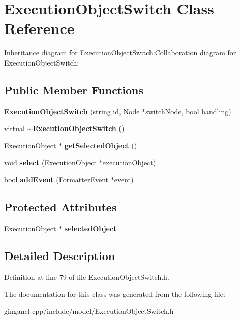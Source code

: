 \section{ExecutionObjectSwitch Class Reference}
\label{classbr_1_1pucrio_1_1telemidia_1_1ginga_1_1ncl_1_1model_1_1switches_1_1ExecutionObjectSwitch}
Inheritance diagram for ExecutionObjectSwitch:Collaboration diagram for ExecutionObjectSwitch:\subsection*{Public Member Functions}
\begin{CompactItemize}
\item 
\textbf{ExecutionObjectSwitch} (string id, Node $\ast$switchNode, bool handling)\label{classbr_1_1pucrio_1_1telemidia_1_1ginga_1_1ncl_1_1model_1_1switches_1_1ExecutionObjectSwitch_b2921cf0a114437720d562ffa4a54dc8}

\item 
virtual {\bf $\sim$ExecutionObjectSwitch} ()\label{classbr_1_1pucrio_1_1telemidia_1_1ginga_1_1ncl_1_1model_1_1switches_1_1ExecutionObjectSwitch_469de2632ae298128da2f5b6f031e8f0}

\item 
ExecutionObject $\ast$ \textbf{getSelectedObject} ()\label{classbr_1_1pucrio_1_1telemidia_1_1ginga_1_1ncl_1_1model_1_1switches_1_1ExecutionObjectSwitch_b2532cf7734bb6731c64cc85e58e6c10}

\item 
void \textbf{select} (ExecutionObject $\ast$executionObject)\label{classbr_1_1pucrio_1_1telemidia_1_1ginga_1_1ncl_1_1model_1_1switches_1_1ExecutionObjectSwitch_892ea5048b918440ea26129d7252cb0e}

\item 
bool \textbf{addEvent} (FormatterEvent $\ast$event)\label{classbr_1_1pucrio_1_1telemidia_1_1ginga_1_1ncl_1_1model_1_1switches_1_1ExecutionObjectSwitch_f4f1974832e6c5b0634f19b51813d773}

\end{CompactItemize}
\subsection*{Protected Attributes}
\begin{CompactItemize}
\item 
ExecutionObject $\ast$ {\bf selectedObject}\label{classbr_1_1pucrio_1_1telemidia_1_1ginga_1_1ncl_1_1model_1_1switches_1_1ExecutionObjectSwitch_49970238d1ded849e4701abfb189ff47}

\end{CompactItemize}


\subsection{Detailed Description}




Definition at line 79 of file ExecutionObjectSwitch.h.

The documentation for this class was generated from the following file:\begin{CompactItemize}
\item 
gingancl-cpp/include/model/ExecutionObjectSwitch.h\end{CompactItemize}
